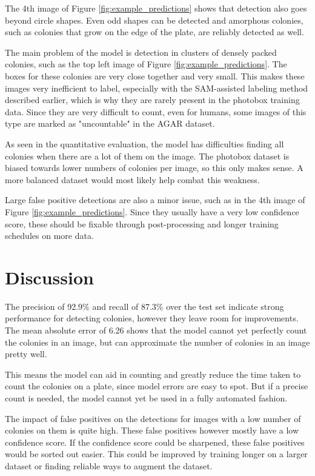 The 4th image of Figure \ref{fig:example_predictions} shows that detection also goes beyond circle shapes. Even odd shapes can be detected and amorphous colonies, such as colonies that grow on the edge of the plate, are reliably detected as well.

The main problem of the model is detection in clusters of densely packed colonies, such as the top left image of Figure \ref{fig:example_predictions}. The boxes for these colonies are very close together and very small. This makes these images very inefficient to label, especially with the SAM-assisted labeling method described earlier, which is why they are rarely present in the photobox training data. Since they are very difficult to count, even for humans, some images of this type are marked as "uncountable" in the AGAR dataset. \cite{majchrowska2021agar}

As seen in the quantitative evaluation, the model has difficulties finding all colonies when there are a lot of them on the image. The photobox dataset is biased towards lower numbers of colonies per image, so this only makes sense. A more balanced dataset would most likely help combat this weakness.

Large false positive detections are also a minor issue, such as in the 4th image of Figure \ref{fig:example_predictions}. Since they usually have a very low confidence score, these should be fixable through post-processing and longer training schedules on more data.

\section{Discussion}

The precision of 92.9\% and recall of 87.3\% over the test set indicate strong performance for detecting colonies, however they leave room for improvements. The mean absolute error of 6.26 shows that the model cannot yet perfectly count the colonies in an image, but can approximate the number of colonies in an image pretty well.

This means the model can aid in counting and greatly reduce the time taken to count the colonies on a plate, since model errors are easy to spot. But if a precise count is needed, the model cannot yet be used in a fully automated fashion.

The impact of false positives on the detections for images with a low number of colonies on them is quite high. These false positives however mostly have a low confidence score. If the confidence score could be sharpened, these false positives would be sorted out easier. This could be improved by training longer on a larger dataset or finding reliable ways to augment the dataset.

